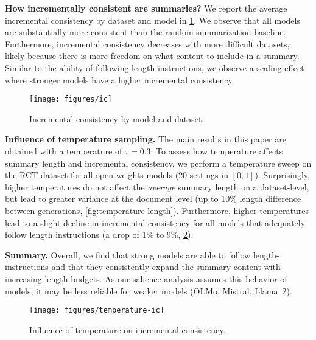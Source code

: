 \noindent\textbf{How incrementally consistent are summaries?}
We report the average incremental consistency by dataset and model in \cref{fig:incremental-consistency}.
We observe that all models are substantially more consistent than the random summarization baseline.
Furthermore, incremental consistency decreases with more difficult datasets, likely because there is more freedom on what content to include in a summary.
Similar to the ability of following length instructions, we observe a scaling effect where stronger models have a higher incremental consistency.

\begin{figure}[t]
\texttt{[image: figures/ic]}
\caption{Incremental consistency by model and dataset.}
\label{fig:incremental-consistency}
\end{figure}

\noindent\textbf{Influence of temperature sampling.}
The main results in this paper are obtained with a temperature of $\tau = 0.3$.
To assess how temperature affects summary length and incremental consistency, we perform a temperature sweep on the RCT dataset for all open-weights models (20 settings in $[0,1]$).
Surprisingly, higher temperatures do not affect the \emph{average} summary length on a dataset-level, but lead to greater variance at the document level (up to 10\% length difference between generations, \cref{fig:temperature-length}).
Furthermore, higher temperatures lead to a slight decline in incremental consistency for all models that adequately follow length instructions (a drop of 1\% to 9\%, \cref{fig:temperature-ic}).

\noindent\textbf{Summary.}
Overall, we find that strong models are able to follow length-instructions and that they consistently expand the summary content with increasing length budgets.
As our salience analysis assumes this behavior of models, it may be less reliable for weaker models (OLMo, Mistral, Llama~2).

\begin{figure}[t]
\texttt{[image: figures/temperature-ic]}
\caption{Influence of temperature on incremental consistency.}
\label{fig:temperature-ic}
\end{figure}

